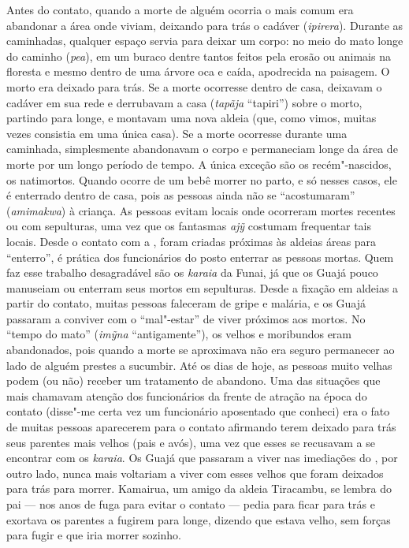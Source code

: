 Antes do contato, quando a morte de alguém ocorria o mais comum era
abandonar a área onde viviam, deixando para trás o cadáver
(\emph{ipirera}). Durante as caminhadas, qualquer espaço servia para
deixar um corpo: no meio do mato longe do caminho (\emph{pea}), em um
buraco dentre tantos feitos pela erosão ou animais na floresta e mesmo
dentro de uma árvore oca e caída, apodrecida na paisagem. O morto era
deixado para trás. Se a morte ocorresse dentro de casa, deixavam o
cadáver em sua rede e derrubavam a casa (\emph{tapãja} ``tapiri'') sobre
o morto, partindo para longe, e montavam uma nova aldeia (que, como
vimos, muitas vezes consistia em uma única casa). Se a morte ocorresse
durante uma caminhada, simplesmente abandonavam o corpo e permaneciam
longe da área de morte por um longo período de tempo. A única exceção
são os recém"-nascidos, os natimortos. Quando ocorre de um bebê morrer no
parto, e só nesses casos, ele é enterrado dentro de casa, pois as
pessoas ainda não se ``acostumaram'' (\emph{amimakwa}) à criança. As
pessoas evitam locais onde ocorreram mortes recentes ou com sepulturas,
uma vez que os fantasmas \emph{ajỹ} costumam frequentar tais locais.
Desde o contato com a , foram criadas próximas às aldeias áreas
para ``enterro'', é prática dos funcionários do posto enterrar as pessoas
mortas. Quem faz esse trabalho desagradável são os \emph{karaia} da
Funai, já que os Guajá pouco manuseiam ou enterram seus mortos em
sepulturas. Desde a fixação em aldeias a partir do contato, muitas
pessoas faleceram de gripe e malária, e os Guajá passaram a conviver com
o ``mal"-estar'' de viver próximos aos mortos. No ``tempo do mato''
(\emph{imỹna} ``antigamente''), os velhos e moribundos eram abandonados,
pois quando a morte se aproximava não era seguro permanecer ao lado de
alguém prestes a sucumbir. Até os dias de hoje, as pessoas muito velhas
podem (ou não) receber um tratamento de abandono. Uma das situações que
mais chamavam atenção dos funcionários da frente de atração na época do
contato (disse"-me certa vez um funcionário aposentado que conheci) era o
fato de muitas pessoas aparecerem para o contato afirmando terem deixado
para trás seus parentes mais velhos (pais e avós), uma vez que esses se
recusavam a se encontrar com os \emph{karaia}. Os Guajá que passaram a
viver nas imediações do , por outro lado, nunca mais voltariam a
viver com esses velhos que foram deixados para trás para morrer.
Kamairua, um amigo da aldeia Tiracambu, se lembra do pai --- nos anos de
fuga para evitar o contato --- pedia para ficar para trás e exortava os
parentes a fugirem para longe, dizendo que estava velho, sem forças para
fugir e que iria morrer sozinho.

